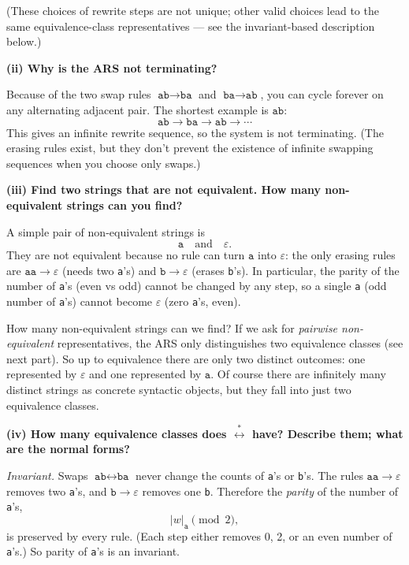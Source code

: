 \documentclass{article}
\theoremstyle{plain}
\theoremstyle{definition}
\theoremstyle{remark}
\begin{document}
(These choices of rewrite steps are not unique; other valid choices lead to the same equivalence-class representatives — see the invariant-based description below.)

\bigskip

\textbf{(ii) Why is the ARS not terminating?}

Because of the two swap rules \(\texttt{ab}\to\texttt{ba}\) and \(\texttt{ba}\to\texttt{ab}\), you can cycle forever on any alternating adjacent pair. The shortest example is \(\texttt{ab}\):
\[
\texttt{ab}\longrightarrow\texttt{ba}\longrightarrow\texttt{ab}\longrightarrow\cdots
\]
This gives an infinite rewrite sequence, so the system is not terminating. (The erasing rules exist, but they don't prevent the existence of infinite swapping sequences when you choose only swaps.)

\bigskip

\textbf{(iii) Find two strings that are not equivalent. How many non-equivalent strings can you find?}

A simple pair of non-equivalent strings is
\[
\texttt{a}\quad\text{and}\quad\varepsilon.
\]
They are not equivalent because no rule can turn \(\texttt{a}\) into \(\varepsilon\): the only erasing rules are \(\texttt{aa}\to\varepsilon\) (needs two \texttt{a}'s) and \(\texttt{b}\to\varepsilon\) (erases \texttt{b}'s). In particular, the parity of the number of \texttt{a}'s (even vs odd) cannot be changed by any step, so a single \texttt{a} (odd number of \texttt{a}'s) cannot become \(\varepsilon\) (zero \texttt{a}'s, even).

How many non-equivalent strings can we find? If we ask for \emph{pairwise non-equivalent} representatives, the ARS only distinguishes two equivalence classes (see next part). So up to equivalence there are only two distinct outcomes: one represented by \(\varepsilon\) and one represented by \(\texttt{a}\). Of course there are infinitely many distinct strings as concrete syntactic objects, but they fall into just two equivalence classes.

\bigskip

\textbf{(iv) How many equivalence classes does \(\stackrel{*}{\longleftrightarrow}\) have? Describe them; what are the normal forms?}

\emph{Invariant.} Swaps \(\texttt{ab}\leftrightarrow\texttt{ba}\) never change the counts of \texttt{a}'s or \texttt{b}'s. The rules \(\texttt{aa}\to\varepsilon\) removes two \texttt{a}'s, and \(\texttt{b}\to\varepsilon\) removes one \texttt{b}. Therefore the \emph{parity} of the number of \texttt{a}'s,
\[
|w|_{\texttt{a}}\pmod{2},
\]
is preserved by every rule. (Each step either removes 0, 2, or an even number of \texttt{a}'s.) So parity of \texttt{a}'s is an invariant.
\end{document}
